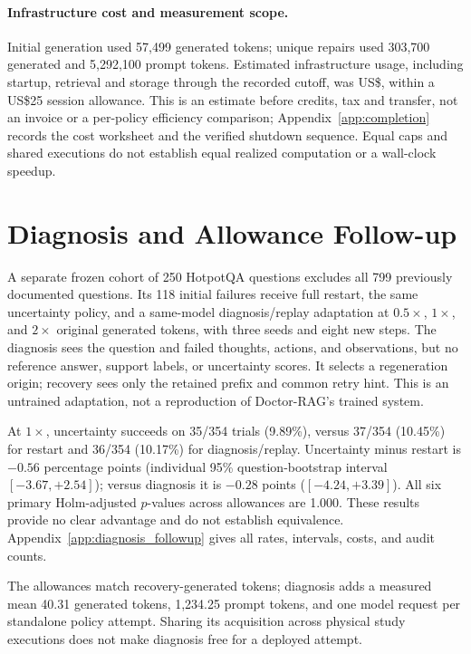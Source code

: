 \documentclass{article}
\begin{document}
\paragraph{Infrastructure cost and measurement scope.}
Initial generation used 57,499 generated tokens; unique repairs used
303,700 generated and 5,292,100 prompt tokens. Estimated infrastructure
usage, including startup, retrieval and storage through the recorded cutoff,
was US\$\MainEstimatedUSD{}, within a US\$25 session allowance. This is an
estimate before credits, tax and transfer, not an invoice or a per-policy
efficiency comparison; Appendix~\ref{app:completion} records the cost
worksheet and the verified shutdown sequence. Equal caps and shared
executions do not establish equal realized computation or a wall-clock
speedup.

\section{Diagnosis and Allowance Follow-up}\label{sec:diagnosis_followup}
A separate frozen cohort of 250 HotpotQA questions excludes all 799
previously documented questions. Its 118 initial failures receive full
restart, the same uncertainty policy, and a same-model diagnosis/replay
adaptation at $0.5\times$, $1\times$, and $2\times$ original generated tokens,
with three seeds and eight new steps. The diagnosis sees the question and
failed thoughts, actions, and observations, but no reference answer,
support labels, or uncertainty scores. It selects a regeneration origin;
recovery sees only the retained prefix and common retry hint. This is an
untrained adaptation, not a reproduction of Doctor-RAG's trained system.

At $1\times$, uncertainty succeeds on 35/354 trials (9.89\%), versus
37/354 (10.45\%) for restart and 36/354 (10.17\%) for diagnosis/replay.
Uncertainty minus restart is $-0.56$ percentage points (individual 95\%
question-bootstrap interval $[-3.67,+2.54]$); versus diagnosis it is
$-0.28$ points ($[-4.24,+3.39]$). All six primary Holm-adjusted $p$-values
across allowances are 1.000. These results provide no clear advantage and
do not establish equivalence. Appendix~\ref{app:diagnosis_followup} gives
all rates, intervals, costs, and audit counts.

The allowances match recovery-generated tokens; diagnosis adds a measured
mean 40.31 generated tokens, 1,234.25 prompt tokens, and one model request
per standalone policy attempt. Sharing its acquisition across physical
study executions does not make diagnosis free for a deployed attempt.
\end{document}
